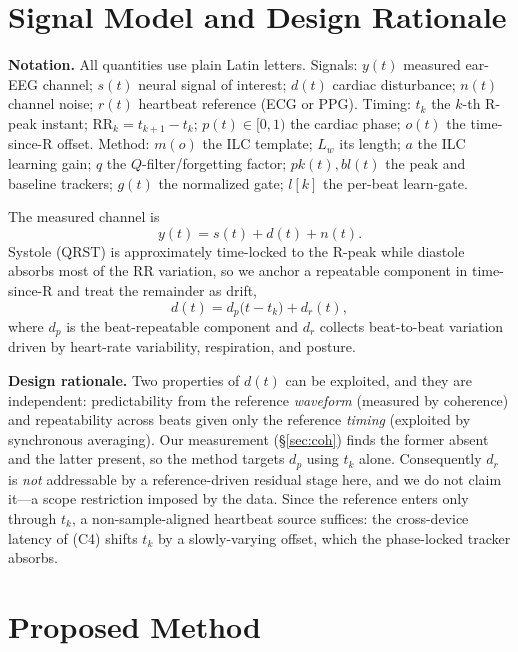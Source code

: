 \documentclass[conference]{IEEEtran}
\begin{document}
\section{Signal Model and Design Rationale}

\textbf{Notation.} All quantities use plain Latin letters. Signals: $y(t)$ measured ear-EEG channel;
$s(t)$ neural signal of interest; $d(t)$ cardiac disturbance; $n(t)$ channel noise; $r(t)$ heartbeat
reference (ECG or PPG). Timing: $t_k$ the $k$-th R-peak instant; $\mathrm{RR}_k=t_{k+1}-t_k$;
$p(t)\in[0,1)$ the cardiac phase; $o(t)$ the time-since-R offset. Method: $m(o)$ the ILC template;
$L_w$ its length; $a$ the ILC learning gain; $q$ the $Q$-filter/forgetting factor; $pk(t),bl(t)$ the
peak and baseline trackers; $g(t)$ the normalized gate; $l[k]$ the per-beat learn-gate.

The measured channel is
\begin{equation}
y(t) = s(t) + d(t) + n(t).
\label{eq:meas}
\end{equation}
Systole (QRST) is approximately time-locked to the R-peak while diastole absorbs most of the RR
variation, so we anchor a repeatable component in time-since-R and treat the remainder as drift,
\begin{equation}
d(t) = d_p\big(t - t_k\big) + d_r(t),
\label{eq:decomp}
\end{equation}
where $d_p$ is the beat-repeatable component and $d_r$ collects beat-to-beat variation driven by
heart-rate variability, respiration, and posture.

\textbf{Design rationale.} Two properties of $d(t)$ can be exploited, and they are independent:
predictability from the reference \emph{waveform} (measured by coherence) and repeatability across
beats given only the reference \emph{timing} (exploited by synchronous averaging). Our measurement
(\S\ref{sec:coh}) finds the former absent and the latter present, so the method targets $d_p$ using
$t_k$ alone. Consequently $d_r$ is \emph{not} addressable by a reference-driven residual stage here,
and we do not claim it---a scope restriction imposed by the data. Since the reference enters only
through $t_k$, a non-sample-aligned heartbeat source suffices: the cross-device latency of (C4)
shifts $t_k$ by a slowly-varying offset, which the phase-locked tracker absorbs.

\section{Proposed Method}
\end{document}
